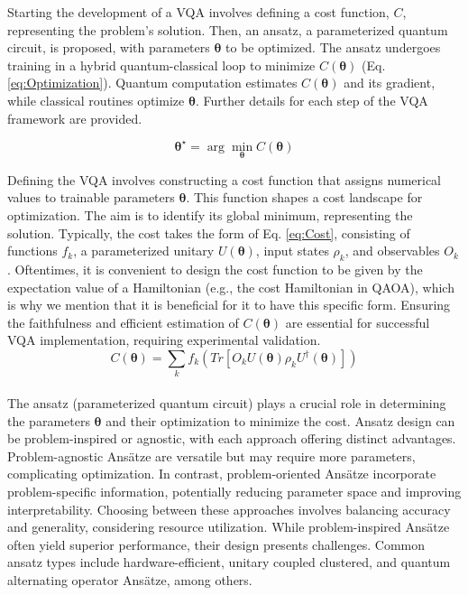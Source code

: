 Starting the development of a VQA involves defining a cost function, \( C \), representing the problem's solution. Then, an ansatz, a parameterized quantum circuit, is proposed, with parameters \(\boldsymbol{\theta}\) to be optimized. The ansatz undergoes training in a hybrid quantum-classical loop to minimize \( C(\boldsymbol{\theta}) \) (Eq. \ref{eq:Optimization}). Quantum computation estimates \( C(\boldsymbol{\theta}) \) and its gradient, while classical routines optimize \(\boldsymbol{\theta}\). Further details for each step of the VQA framework are provided.

\begin{equation}\label{eq:Optimization}
\boldsymbol{\theta}^{\star} = \arg \min_{\boldsymbol{\theta}} C(\boldsymbol{\theta})
\end{equation}

 Defining the VQA involves constructing a cost function that assigns numerical values to trainable parameters \(\boldsymbol{\theta}\). This function shapes a cost landscape for optimization. The aim is to identify its global minimum, representing the solution. Typically, the cost takes the form of Eq. \ref{eq:Cost}, consisting of functions \(f_k\), a parameterized unitary \(U(\boldsymbol{\theta})\), input states \(\rho_k\), and observables \(O_k\). Oftentimes, it is convenient to design the cost function to be given by the expectation value of a Hamiltonian (e.g., the cost Hamiltonian in QAOA), which is why we mention that it is beneficial for it to have this specific form. Ensuring the faithfulness and efficient estimation of \(C(\boldsymbol{\theta})\) are essential for successful VQA implementation, requiring experimental validation.
\begin{equation}\label{eq:Cost}
C(\boldsymbol{\theta}) = \sum_k f_k\left( Tr\left[O_k U(\boldsymbol{\theta}) \rho_k U^{\dagger}(\boldsymbol{\theta})\right] \right)
\end{equation}
\\


 The ansatz (parameterized quantum circuit) plays a crucial role in determining the parameters $\boldsymbol{\theta}$ and their optimization to minimize the cost. Ansatz design can be problem-inspired or agnostic, with each approach offering distinct advantages. Problem-agnostic Ansätze are versatile but may require more parameters, complicating optimization. In contrast, problem-oriented Ansätze incorporate problem-specific information, potentially reducing parameter space and improving interpretability. Choosing between these approaches involves balancing accuracy and generality, considering resource utilization. While problem-inspired Ansätze often yield superior performance, their design presents challenges. Common ansatz types include hardware-efficient, unitary coupled clustered, and quantum alternating operator Ansätze, among others. \\

